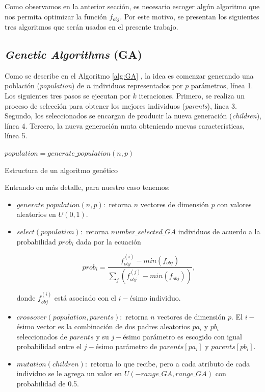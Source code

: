 Como observamos en la anterior sección, es necesario escoger algún algoritmo
que nos permita optimizar la función $f_{obj}$. 
Por este motivo, se presentan los siguientes tres algoritmos que serán usados en el presente trabajo.

\subsection{\emph{Genetic Algorithms} (GA)}

Como se describe en el Algoritmo \ref{alg:GA} \citep{Mykel2019}, la idea es  
comenzar generando una población (\emph{population}) de $n$ individuos representados por $p$
parámetros, línea 1. 
Los siguientes tres pasos se ejecutan por $k$ iteraciones.
Primero, se realiza un proceso de selección para obtener los mejores individuos
(\emph{parents}), línea 3.
Segundo, los seleccionados se encargan de producir la nueva generación
(\emph{children}), línea 4.
Tercero, la nueva generación muta obteniendo nuevas características, línea 5.

\begin{algorithm}
$population = generate\_population(n, p)$ \\
\caption{Estructura de un algoritmo genético}
\label{alg:GA}
\end{algorithm}

Entrando en más detalle, para nuestro caso tenemos:

\begin{itemize}
    \item $generate\_population(n, p):$ retorna $n$ vectores de dimensión $p$
      con valores aleatorios en $U(0, 1)$.

    \item $select(population):$ retorna $number\_selected\_GA$ individuos de
      acuerdo a la probabilidad $prob_i$ dada por la ecuación
    
    \begin{equation}
      prob_i = \frac{f_{obj}^{(i)} - min(f_{obj})}{\displaystyle\sum_{j} (f_{obj}^{(j)} - min(f_{obj}))},
    \label{eq:prob}
    \end{equation}
    
    donde $f_{obj}^{(i)}$ está asociado con el $i-$ésimo individuo.
    
    \item $crossover(population, parents):$ retorna $n$ vectores de dimensión $p$.
    El $i-$ésimo vector es la combinación de dos padres aleatorios $pa_i$
    y $pb_i$ seleccionados de $parents$ y su $j-$ésimo parámetro es escogido
    con igual probabilidad entre el $j-$ésimo parámetro de $parents[pa_i]$
    y $parents[pb_i]$.

    \item $mutation(children):$ retorna lo que recibe, pero a cada atributo de
      cada individuo se le agrega un valor en $U(-range\_GA, range\_GA)$ con
      probabilidad de 0.5.

\end{itemize}

